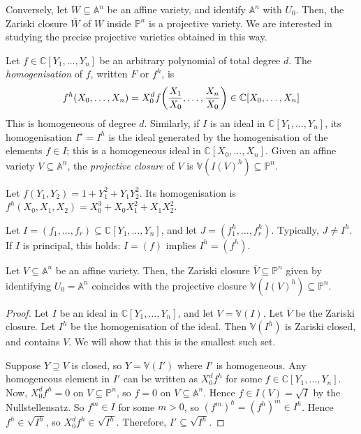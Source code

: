 Conversely, let \( W \subseteq \mathbb A^n \) be an affine variety, and identify \( \mathbb A^n \) with \( U_0 \).
Then, the Zariski closure \( \overline W \) of \( W \) inside \( \mathbb P^n \) is a projective variety.
We are interested in studying the precise projective varieties obtained in this way.
\begin{definition}
    Let \( f \in \mathbb C[Y_1, \dots, Y_n] \) be an arbitrary polynomial of total degree \( d \).
    The \emph{homogenisation} of \( f \), written \( F \) or \( f^h \), is
    \[ f^h(X_0, \dots, X_n) = X_0^d f\qty(\frac{X_1}{X_0}, \dots, \frac{X_n}{X_0}) \in \mathbb C[X_0, \dots, X_n] \]
    This is homogeneous of degree \( d \).
    Similarly, if \( I \) is an ideal in \( \mathbb C[Y_1, \dots, Y_n] \), its homogenisation \( I^\star = I^h \) is the ideal generated by the homogenisation of the elements \( f \in I \); this is a homogeneous ideal in \( \mathbb C[X_0, \dots, X_n] \).
    Given an affine variety \( V \subseteq \mathbb A^n \), the \emph{projective closure} of \( V \) is \( \mathbb V(I(V)^h) \subseteq \mathbb P^n \).
\end{definition}
\begin{example}
    Let \( f(Y_1, Y_2) = 1 + Y_1^2 + Y_1 Y_2^2 \).
    Its homogenisation is \( f^h(X_0, X_1, X_2) = X_0^3 + X_0 X_1^2 + X_1 X_2^2 \).
\end{example}
\begin{remark}
    Let \( I = (f_1, \dots, f_r) \subseteq \mathbb C[Y_1, \dots, Y_n] \), and let \( J = (f_1^h, \dots, f_r^h) \).
    Typically, \( J \neq I^h \).
    If \( I \) is principal, this holds: \( I = (f) \) implies \( I^h = (f^h) \).
\end{remark}
\begin{proposition}
    Let \( V \subseteq \mathbb A^n \) be an affine variety.
    Then, the Zariski closure \( \overline V \subseteq \mathbb P^n \) given by identifying \( U_0 = \mathbb A^n \) coincides with the projective closure \( \mathbb V(I(V)^h) \subseteq \mathbb P^n \).
\end{proposition}
\begin{proof}
    Let \( I \) be an ideal in \( \mathbb C[Y_1, \dots, Y_n] \), and let \( V = \mathbb V(I) \).
    Let \( \overline V \) be the Zariski closure.
    Let \( I^h \) be the homogenisation of the ideal.
    Then \( \mathbb V(I^h) \) is Zariski closed, and contains \( V \).
    We will show that this is the smallest such set.

    Suppose \( Y \supseteq V \) is closed, so \( Y = \mathbb V(I') \) where \( I' \) is homogeneous.
    Any homogeneous element in \( I' \) can be written as \( X_0^d f^h \) for some \( f \in \mathbb C[Y_1, \dots, Y_n] \).
    Now, \( X_0^d f^h = 0 \) on \( V \subseteq \mathbb P^n \), so \( f = 0 \) on \( V \subseteq \mathbb A^n \).
    Hence \( f \in I(V) = \sqrt{I} \) by the Nullstellensatz.
    So \( f^m \in I \) for some \( m > 0 \), so \( (f^m)^h = (f^h)^m \in I^h \).
    Hence \( f^h \in \sqrt{I^h} \), so \( X_0^d f^h \in \sqrt{I^h} \).
    Therefore, \( I' \subseteq \sqrt{I^h} \).
\end{proof}
